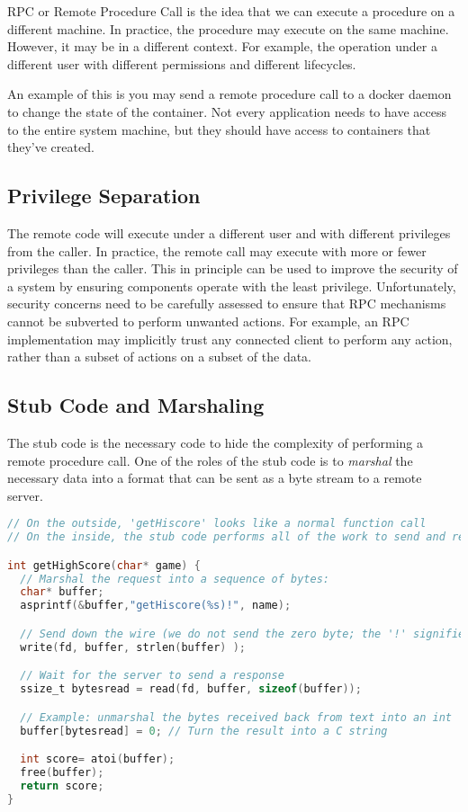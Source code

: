 RPC or Remote Procedure Call is the idea that we can execute a procedure on a different machine.
In practice, the procedure may execute on the same machine.
However, it may be in a different context.
For example, the operation under a different user with different permissions and different lifecycles.

An example of this is you may send a remote procedure call to a docker daemon to change the state of the container.
Not every application needs to have access to the entire system machine, but they should have access to containers that they've created.

\subsection{Privilege Separation}

The remote code will execute under a different user and with different privileges from the caller.
In practice, the remote call may execute with more or fewer privileges than the caller.
This in principle can be used to improve the security of a system by ensuring components operate with the least privilege.
Unfortunately, security concerns need to be carefully assessed to ensure that RPC mechanisms cannot be subverted to perform unwanted actions.
For example, an RPC implementation may implicitly trust any connected client to perform any action, rather than a subset of actions on a subset of the data.

\subsection{Stub Code and Marshaling}

The stub code is the necessary code to hide the complexity of performing a remote procedure call.
One of the roles of the stub code is to \emph{marshal} the necessary data into a format that can be sent as a byte stream to a remote server.

\begin{lstlisting}[language=C]
// On the outside, 'getHiscore' looks like a normal function call
// On the inside, the stub code performs all of the work to send and receive data to and from the remote machine.

int getHighScore(char* game) {
  // Marshal the request into a sequence of bytes:
  char* buffer;
  asprintf(&buffer,"getHiscore(%s)!", name);

  // Send down the wire (we do not send the zero byte; the '!' signifies the end of the message)
  write(fd, buffer, strlen(buffer) );

  // Wait for the server to send a response
  ssize_t bytesread = read(fd, buffer, sizeof(buffer));

  // Example: unmarshal the bytes received back from text into an int
  buffer[bytesread] = 0; // Turn the result into a C string

  int score= atoi(buffer);
  free(buffer);
  return score;
}
\end{lstlisting}

